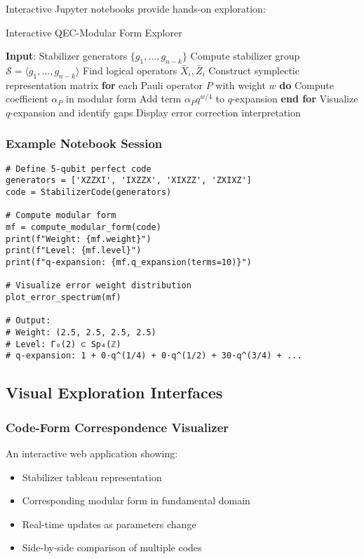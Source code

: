 \documentclass[11pt,a4paper]{article}
\newcommand{\calS}{\mathcal{S}}
\begin{document}
Interactive Jupyter notebooks provide hands-on exploration:

\begin{algorithm}
\caption{Interactive QEC-Modular Form Explorer}
\begin{algorithmic}[1]
\STATE \textbf{Input}: Stabilizer generators $\{g_1, \ldots, g_{n-k}\}$
\STATE Compute stabilizer group $\calS = \langle g_1, \ldots, g_{n-k} \rangle$
\STATE Find logical operators $\bar{X}_i, \bar{Z}_i$
\STATE Construct symplectic representation matrix
\STATE \textbf{for} each Pauli operator $P$ with weight $w$ \textbf{do}
\STATE \quad Compute coefficient $\alpha_P$ in modular form
\STATE \quad Add term $\alpha_P q^{w/4}$ to $q$-expansion
\STATE \textbf{end for}
\STATE Visualize $q$-expansion and identify gaps
\STATE Display error correction interpretation
\end{algorithmic}
\end{algorithm}

\subsubsection{Example Notebook Session}
\begin{verbatim}
# Define 5-qubit perfect code
generators = ['XZZXI', 'IXZZX', 'XIXZZ', 'ZXIXZ']
code = StabilizerCode(generators)

# Compute modular form
mf = compute_modular_form(code)
print(f"Weight: {mf.weight}")
print(f"Level: {mf.level}")
print(f"q-expansion: {mf.q_expansion(terms=10)}")

# Visualize error weight distribution
plot_error_spectrum(mf)

# Output:
# Weight: (2.5, 2.5, 2.5, 2.5)
# Level: Γ₀(2) ⊂ Sp₄(ℤ)
# q-expansion: 1 + 0·q^(1/4) + 0·q^(1/2) + 30·q^(3/4) + ...
\end{verbatim}

\subsection{Visual Exploration Interfaces}

\subsubsection{Code-Form Correspondence Visualizer}
An interactive web application showing:
\begin{itemize}
\item Stabilizer tableau representation
\item Corresponding modular form in fundamental domain
\item Real-time updates as parameters change
\item Side-by-side comparison of multiple codes
\end{itemize}
\end{document}
